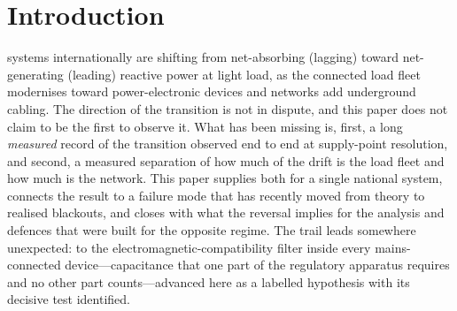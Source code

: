 \documentclass[journal]{IEEEtran}
\begin{document}
\section{Introduction}
 systems internationally are shifting from net-absorbing
(lagging) toward net-generating (leading) reactive power at light load, as the
connected load fleet modernises toward power-electronic devices and networks add
underground cabling. The direction of the transition is not in dispute, and
this paper does not claim to be the first to observe it. What has been missing is,
first, a long \emph{measured} record of the transition observed end to end at
supply-point resolution, and second, a measured separation of how much of the
drift is the load fleet and how much is the network. This paper supplies both for
a single national system, connects the result to a failure mode that has
recently moved from theory to realised blackouts, and closes with what the
reversal implies for the analysis and defences that were built for the opposite
regime. The trail leads somewhere unexpected: to the electromagnetic-compatibility
filter inside every mains-connected device---capacitance that one part of the
regulatory apparatus requires and no other part counts---advanced here as a
labelled hypothesis with its decisive test identified.
\end{document}
